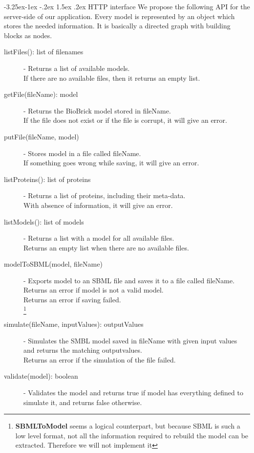 \documentclass[a4paper]{article}
\makeatletter
\renewcommand\paragraph{\@startsection{paragraph}{4}{\z@}%
  {-3.25ex\@plus -1ex \@minus -.2ex}%
  {1.5ex \@plus .2ex}%
  {\normalfont\normalsize\bfseries}}
\makeatother
\begin{document}
\paragraph{HTTP interface} 
We propose the following API for the server-side of our application. Every model is represented by an object which stores the needed information. It is basically a directed graph with building blocks as nodes. \\
\begin{description}
	\item[listFiles(): list of filenames] -
		Returns a list of available models.\\
		If there are no available files, then it returns an empty list.
	\item[getFile(fileName): model] -
		Returns the BioBrick model stored in fileName.\\
		If the file does not exist or if the file is corrupt, it will give an error.
	\item[putFile(fileName, model)] -
		Stores model in a file called fileName.\\
		If something goes wrong while saving, it will give an error.
	\item[listProteins(): list of proteins] -
		Returns a list of proteins, including their meta-data.\\
		With absence of information, it will give an error.
	\item[listModels(): list of models] -
		Returns a list with a model for all available files.\\
		Returns an empty list when there are no available files.
	\item[modelToSBML(model, fileName)] -
		Exports model to an SBML file and saves it to a file called fileName.\\
		Returns an error if model is not a valid model.\\
		Returns an error if saving failed. \\
	\footnote{\textbf{SBMLToModel} seems a logical counterpart, but because SBML is such a low level format, not all the information required to rebuild the model can be extracted. Therefore we will not implement it}
	\item[simulate(fileName, inputValues): outputValues] -
		Simulates the SMBL model saved in fileName with given input values and returns the matching outputvalues.\\
		Returns an error if the simulation of the file failed.
	\item[validate(model): boolean] -
		Validates the model and returns true if model has everything defined to simulate it, and returns false otherwise.\\
\end{description}
\end{document}

